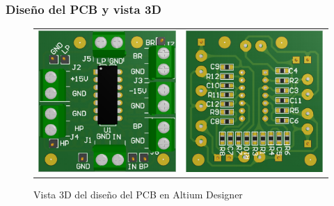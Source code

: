 \subsubsection{Dise\~no del PCB y vista 3D}

\begin{figure}[H]
    \centering
        \begin{tabular}{c c}
            \includegraphics[scale=0.5]{../EJ2/Recursos/top_3d.PNG} &
            \includegraphics[scale=0.5]{../EJ2/Recursos/bottom_3d.PNG}
        \end{tabular}
    \caption{Vista 3D del dise\~no del PCB en Altium Designer}
    \label{fig:vista_3d}
\end{figure}
